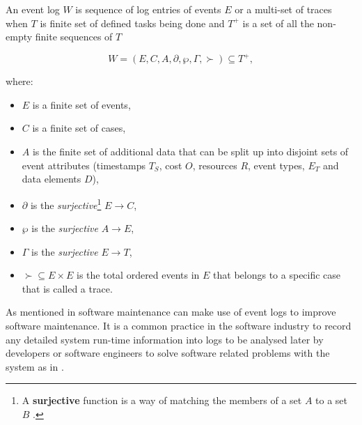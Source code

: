 An event log $W$ is sequence of log entries of events $E$ or a multi-set of traces when $T$ is finite set of defined tasks being done and $T^+$ is a set of all the non-empty finite sequences of $T$ \cite{Kherbouche2017}

\begin{equation}
	\label{eq:LogEvent}
	W = (E, C, A, \partial, \wp, \Gamma, \succ) \subseteq T^+,
\end{equation}

where:

\begin{itemize}
	\item $E$ is a finite set of events,
	\item $C$ is a finite set of cases,
	\item $A$ is the finite set of additional data that can be split up into disjoint sets of event attributes (timestamps $T_S$, cost $O$, resources $R$, event types, $E_T$ and data elements $D$),
	\item $\partial$ is the \textit{surjective}\footnote{\label{ftn:Surjective}A \textbf{surjective} function is a way of matching the members of a set $A$ to a set $B$ \cite{Szendrei1990}.} $E\rightarrow C$,
	\item $\wp$ is the \textit{surjective} $A\rightarrow E$,
	\item $\Gamma$ is the \textit{surjective} $E\rightarrow T$,
	\item $\succ \subseteq E\times E$ is the total ordered events in $E$ that belongs to a specific case that is called a trace.
\end{itemize}

As mentioned in  software maintenance can make use of event logs to improve software maintenance. It is a common practice in the software industry to record any detailed system run-time information into logs to be analysed later by developers or software engineers to solve software related problems with the system as in  \cite{Zhu2019}.

